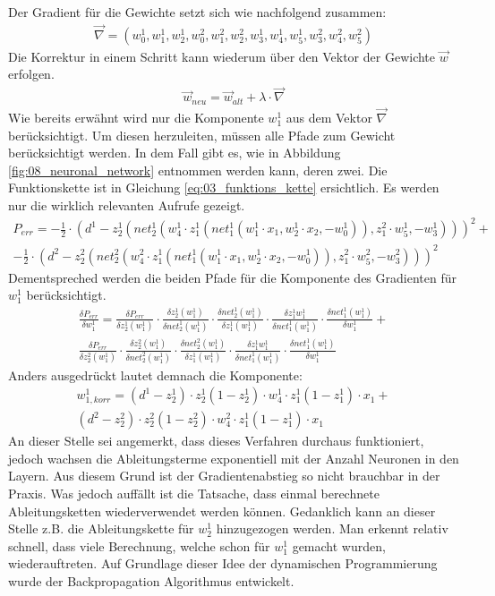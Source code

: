 Der Gradient für die Gewichte setzt sich wie nachfolgend zusammen:
\begin{align}
    \vec{\nabla} = (w_0^1, w_1^1, w_2^1, w_0^2, w_1^2, w_2^2, w_3^1, w_4^1, w_5^1, w_3^2, w_4^2, w_5^2)
\end{align}
Die Korrektur in einem Schritt kann wiederum über den Vektor der Gewichte $\vec{w}$ erfolgen.
\begin{align}
    \vec{w}_{neu} = \vec{w}_{alt} + \lambda \cdot \vec{\nabla}
\end{align}
Wie bereits erwähnt wird nur die Komponente $w_1^1$ aus dem Vektor $\vec{\nabla}$
berücksichtigt. Um diesen herzuleiten, müssen alle Pfade zum Gewicht berücksichtigt werden.
In dem Fall gibt es, wie in Abbildung \ref{fig:08_neuronal_network} entnommen werden kann, deren zwei.
Die Funktionskette ist in Gleichung \ref{eq:03_funktions_kette} ersichtlich. Es werden nur die wirklich relevanten Aufrufe
gezeigt.
\begin{multline}
    P_{err} = - \frac{1}{2} \cdot (d^1 - z_2^1(net_2^1(w_4^1 \cdot z_1^1(net_1^1(w_1^1 \cdot x_1, w_2^1 \cdot x_2, -w_0^1)), z_1^2 \cdot w_5^1, -w_3^1)))^2 +\\\label{eq:03_funktions_kette}
    - \frac{1}{2} \cdot (d^2 - z_2^2(net_2^2(w_4^2 \cdot z_1^1(net_1^1(w_1^1 \cdot x_1, w_2^1 \cdot x_2, -w_0^1)), z_1^2 \cdot w_5^2, -w_3^2)))^2
\end{multline}
Dementspreched werden die beiden Pfade für die Komponente des Gradienten für $w_1^1$ berücksichtigt.
\begin{multline}
    \frac{\delta P_{err}}{\delta w_1^1} = \frac{\delta P_{err}}{\delta z_2^1(w_1^1)} \cdot \frac{\delta z_2^1(w_1^1)}{\delta net_2^1(w_1^1)} \cdot \frac{\delta net_2^1(w_1^1)}{\delta z_1^1(w_1^1)} \cdot \frac{\delta z_1^1{w_1^1}}{\delta net_1^1(w_1^1)} \cdot \frac{\delta net_1^1(w_1^1)}{\delta w_1^1} +\\
    \frac{\delta P_{err}}{\delta z_2^2(w_1^1)} \cdot \frac{\delta z_2^2(w_1^1)}{\delta net_2^2(w_1^1)} \cdot \frac{\delta net_2^2(w_1^1)}{\delta z_1^1(w_1^1)} \cdot \frac{\delta z_1^1{w_1^1}}{\delta net_1^1(w_1^1)} \cdot \frac{\delta net_1^1(w_1^1)}{\delta w_1^1}
\end{multline}
Anders ausgedrückt lautet demnach die Komponente:
\begin{multline}
    w_{1,korr}^1 = (d^1 - z_2^1) \cdot z_2^1(1 - z_2^1) \cdot w_4^1 \cdot z_1^1(1 - z_1^1) \cdot x_1 +\\
    (d^2 - z_2^2) \cdot z_2^2(1 - z_2^2) \cdot w_4^2 \cdot z_1^1(1 - z_1^1) \cdot x_1
\end{multline}
An dieser Stelle sei angemerkt, dass dieses Verfahren durchaus funktioniert, jedoch wachsen die Ableitungsterme
exponentiell mit der Anzahl Neuronen in den Layern. Aus diesem Grund ist der Gradientenabstieg so nicht brauchbar in
der Praxis. Was jedoch auffällt ist die Tatsache, dass einmal berechnete Ableitungsketten wiederverwendet werden können.
Gedanklich kann an dieser Stelle z.B. die Ableitungskette für $w_2^1$ hinzugezogen werden. Man erkennt relativ schnell,
dass viele Berechnung, welche schon für $w_1^1$ gemacht wurden, wiederauftreten. Auf Grundlage dieser Idee der
dynamischen Programmierung wurde der Backpropagation Algorithmus entwickelt.

